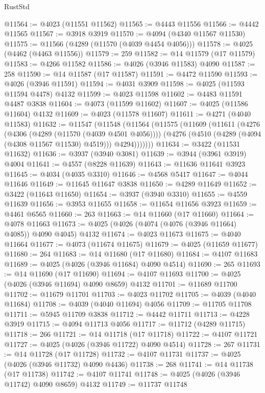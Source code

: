 \begin{lexlean}{RustStd}
\begin{coremodule}
@11564 := @4023 (@11551 @11562)
@11565 := @4443 @11556
@11566 := @4442 @11565
@11567 := @3918 @3919
@11570 := @4094 (@4340 @11567 @11530)
@11575 := @11566 (@4289 (@11570 (@4039 @4454 @4056)))
@11578 := @4025 (@4462 (@4463 @11556))
@11579 := 259
@11582 := @14 @11579 (@17 @11579)
@11583 := @4266 @11582
@11586 := @4026 (@3946 @11583) @4090
@11587 := 258
@11590 := @14 @11587 (@17 @11587)
@11591 := @4472 @11590
@11593 := @4026 (@3946 @11591)
@11594 := @4031 @3909
@11598 := @4025 (@11593 @11594 @4478) @4132
@11599 := @4023 @11598
@11602 := @4483 @11591 @4487 @3838
@11604 := @4073 (@11599 @11602)
@11607 := @4025 (@11586 @11604) @4132
@11609 := @4023 (@11578 @11607)
@11611 := @4271 (@4040 @11583)
@11632 := @11547
    (@11548
      (@11564
        (@11575
          (@11609
            (@11611
              (@4276
                (@4306 (@4289 (@11570 (@4039 @4501 @4056))))
                (@4276 (@4510 (@4289 (@4094 (@4308 @11567 @11530) @4519))) @4294)))))))
@11634 := @3422 (@11531 @11632)
@11636 := @3937 (@3940 @3081)
@11639 := @3944 (@3961 @3919) @4004
@11641 := @4557 (@8228 @11639)
@11643 := @11636 @11641 @3923
@11645 := @4034 (@4035 @3310)
@11646 := @4568 @5417
@11647 := @4044 @11646
@11649 := @11645 @11647 @3838
@11650 := @4289 @11649
@11652 := @3422 (@11643 @11650)
@11654 := @3937 (@3940 @3310)
@11655 := @4559 @11639
@11656 := @3953 @11655
@11658 := @11654 @11656 @3923
@11659 := @4461 @6565
@11660 := 263
@11663 := @14 @11660 (@17 @11660)
@11664 := @4078 @11663
@11673 := @4025 (@4026 (@4074 (@4076 (@3946 @11664) @4085)) @4090 @4045) @4132
@11674 := @4023 @11673
@11675 := @4040 @11664
@11677 := @4073 (@11674 @11675)
@11679 := @4025 (@11659 @11677)
@11680 := 264
@11683 := @14 @11680 (@17 @11680)
@11684 := @4107 @11683
@11689 := @4025 (@4026 (@3946 @11684) @4090 @4514)
@11690 := 265
@11693 := @14 @11690 (@17 @11690)
@11694 := @4107 @11693
@11700 := @4025 (@4026 (@3946 @11694) @4090 @8659) @4132
@11701 := @11689 @11700
@11702 := @11679 @11701
@11703 := @4023 @11702
@11705 := @4039 (@4040 @11684)
@11708 := @4039 (@4040 @11694) @4056
@11709 := @11705 @11708
@11711 := @5945 @11709 @3838
@11712 := @4442 @11711
@11713 := @4228 @3919
@11715 := @4094 @11713 @4056
@11717 := @11712 (@4289 @11715)
@11718 := 266
@11721 := @14 @11718 (@17 @11718)
@11722 := @4107 @11721
@11727 := @4025 (@4026 (@3946 @11722) @4090 @4514)
@11728 := 267
@11731 := @14 @11728 (@17 @11728)
@11732 := @4107 @11731
@11737 := @4025 (@4026 (@3946 @11732) @4090 @4436)
@11738 := 268
@11741 := @14 @11738 (@17 @11738)
@11742 := @4107 @11741
@11748 := @4025 (@4026 (@3946 @11742) @4090 @8659) @4132
@11749 := @11737 @11748

\end{coremodule}
\end{lexlean}
